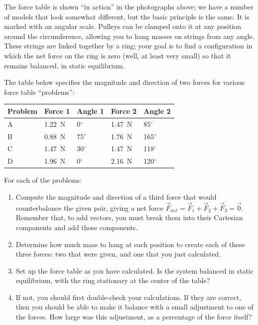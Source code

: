 \documentclass[11pt]{article}
\begin{document}
The force table is shown ``in action'' in the photographs above; we have a 
number of models that look somewhat different, but the basic principle is 
the same.  It is marked with an angular scale.  Pulleys can be clamped onto
it at any position around the circumference, allowing you to hang masses
on strings from any angle.  These strings are linked together by a ring;
your goal is to find a configuration in which the net force on the ring 
is zero (well, at least very small) so that it remains balanced, 
in static equilibrium.

The table below specifies the magnitude and direction of two forces for
various force table ``problems'':

\begin{center}
\begin{tabular}{l|ll|ll}
\hline
Problem & Force 1 & Angle 1 & Force 2 & Angle 2 \\
\hline
A & 1.22~N  & 0$^\circ$ & 1.47~N & 85$^\circ$ \\
B & 0.88~N & 75$^\circ$ & 1.76~N & 165$^\circ$ \\
C & 1.47~N & 30$^\circ$ & 1.47~N & 118$^\circ$ \\
D & 1.96~N & 0$^\circ$ & 2.16~N & 120$^\circ$ \\
\hline
\end{tabular}
\end{center}


\medskip

\noindent For each of the problems:
\begin{enumerate}
\item Compute the magnitude and direction of a third force that would 
counterbalance the given pair, giving a net force
${\vec F}_{net} = {\vec F}_1 + {\vec F}_2 + {\vec F}_3 = \vec 0$.
Remember that, to add vectors, you must break them into their Cartesian
components and add those components.
\item Determine how much mass to hang at each position 
 to create each of these three forces: two that were given, and one that
 you just calculated.
\item Set up the force table as you have calculated.  Is the system balanced
  in static equilibrium, with the ring stationary at the center of the table?  
\item If not, you should first double-check your calculations.  If they are 
  correct, then you should be able to make it balance with a small 
  adjustment to one of the forces.  How large was this adjustment,
  as a percentage of the force itself?
\end{enumerate}  
\end{document}
